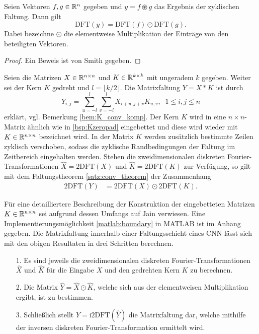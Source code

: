 \begin{satz}
    \label{satz:conv_theorem}
    Seien Vektoren $f,g \in \mathbb{R}^{n}$ gegeben und $y= f \circledast g$ das Ergebnis der zyklischen Faltung. Dann gilt
    \begin{equation}
        \mathrm{DFT}(y)=\mathrm{DFT}(f) \odot \mathrm{DFT}(g).
    \end{equation}
    Dabei bezeichne $\odot$ die elementweise Multiplikation der Einträge von den beteiligten Vektoren.
\end{satz}
\begin{proof}
    Ein Beweis ist von Smith\cite{smith2007mathematics} gegeben.
\end{proof}
\begin{bem}
    Seien die Matrizen $X \in \mathbb{R}^{n \times n}$ und $K \in \mathbb{R}^{k \times k}$ mit ungeradem $k$ gegeben. Weiter sei der Kern $K$ gedreht und $l=\lfloor k/2 \rfloor$. Die Matrixfaltung $Y= X \ast K$ ist durch
    \begin{equation*}
        Y_{i,j}=\sum_{u=-l}^l \sum_{v=-l}^l X_{i+u, j+v} K_{u,v}, \; \; 1 \leq i, j \leq n
    \end{equation*}
    erklärt, vgl. Bemerkung \ref{bem:K_conv_komp}.
    Der Kern $K$ wird in eine $n \times n$-Matrix ähnlich wie in \ref{bsp:Kzeropad} eingebettet und diese wird wieder mit $K \in \mathbb{R}^{n \times n}$ bezeichnet wird. In der Matrix $K$ werden zusätzlich bestimmte Zeilen zyklisch verschoben, sodass die zyklische Randbedingungen der Faltung im Zeitbereich eingehalten werden. Stehen die zweidimensionalen diskreten Fourier-Transformationen $\hat{X}=\mathrm{2DFT}(X)$ und $\hat{K}=\mathrm{2DFT}(K)$ zur Verfügung, so gilt mit dem Faltungstheorem \ref{satz:conv_theorem} der Zusammenhang
    \begin{align*}
        \mathrm{2DFT}(Y)&=\mathrm{2DFT}(X) \odot \mathrm{2DFT}(K). 
    \end{align*}
\end{bem}
Für eine detailliertere Beschreibung der Konstruktion der eingebetteten Matrizen $K \in \mathbb{R}^{n \times n}$ sei aufgrund dessen Umfangs auf Jain \cite{jain1989fundamentals} verwiesen. Eine Implementierungsmöglichkeit \ref{matlab:boundary} in MATLAB ist im Anhang gegeben.
Die Matrixfaltung innerhalb einer Faltungsschicht eines CNN lässt sich mit den obigen Resultaten in drei Schritten berechnen.
\begin{itemize}
    \item[1.] Es sind jeweils die zweidimensionalen diskreten Fourier-Transformationen $\hat{X}$ und $\hat{K}$ für die Eingabe $X$ und den gedrehten Kern $K$ zu berechnen.
    \item[2.] Die Matrix $\hat{Y}= \hat{X} \odot \hat{K}$, welche sich aus der elementweisen Multiplikation ergibt, ist zu bestimmen.
    \item[3.] Schließlich stellt $Y=\mathrm{i2DFT}(\hat{Y})$ die Matrixfaltung dar, welche mithilfe der inversen diskreten Fourier-Transformation ermittelt wird.    
\end{itemize} 
